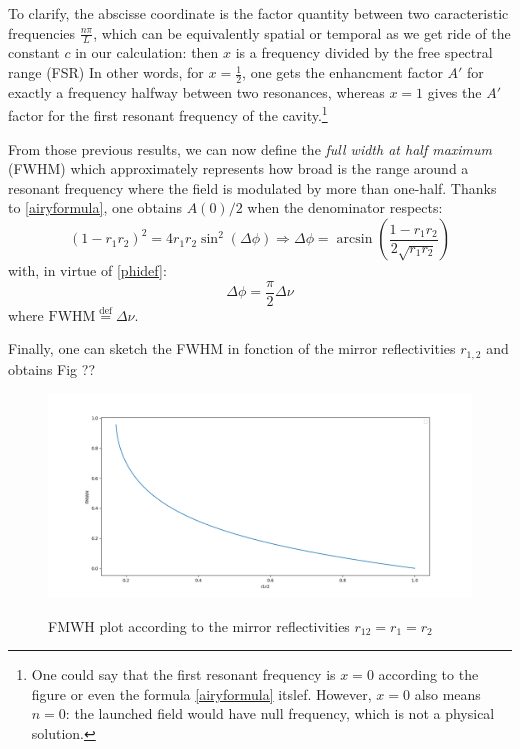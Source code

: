 \documentclass[12pt]{report}
\begin{document}
To clarify, the abscisse coordinate is the factor quantity between two caracteristic frequencies $\frac{n\pi}{L}$, which can be equivalently spatial or temporal as we get ride of the constant $c$ in our calculation: then $x$ is a frequency divided by the free spectral range (FSR) In other words, for $x=\frac{1}{2}$, one gets the enhancment factor $A'$ for exactly a frequency halfway between two resonances, whereas $x=1$ gives the $A'$ factor for the first resonant frequency of the cavity.\footnote{One could say that the first resonant frequency is $x=0$ according to the figure or even the formula \eqref{airyformula} itslef. However, $x=0$ also means $n=0$: the launched field would have null frequency, which is not a physical solution.}

From those previous results, we can now define the \textit{full width at half maximum} (FWHM) which approximately represents how broad is the range around a resonant frequency where the field is modulated by more than one-half. Thanks to \eqref{airyformula}, one obtains $ A(0) / 2$ when the denominator respects:
\begin{equation}
(1 - r_1 r_2)^2 = 4 r_1 r_2 \sin^2(\Delta\phi) \Rightarrow \Delta\phi = \arcsin \left(\frac{1 - r_1 r_2}{2\sqrt{r_1r_2}} \right)
\end{equation}
with, in virtue of \eqref{phidef}:
\begin{equation}
\Delta\phi = \frac{\pi}{2}\Delta\nu
\end{equation}
where $\textrm{FWHM} \stackrel{\text{def}}{=} \Delta\nu$.

Finally, one can sketch the FWHM in fonction of the mirror reflectivities $r_{1,2}$ and obtains Fig ??

\begin{figure}[h]
\caption{FMWH plot according to the mirror reflectivities $r_{12} = r_1 = r_2$}
\centering
\includegraphics[width=\textwidth]{airy-fmwh}
\label{fig:airy-fmwh}
\end{figure}
\end{document}
